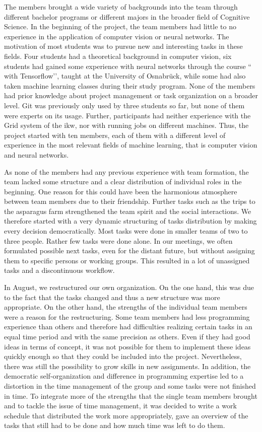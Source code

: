 \bigskip
The members brought a wide variety of backgrounds into the team through different bachelor programs or different majors in the broader field of Cognitive Science. In the beginning of the project, the team members had little to no experience in the application of computer vision or neural networks. The motivation of most students was to pursue new and interesting tasks in these fields. Four students had a theoretical background in computer vision, six students had gained some experience with neural networks through the course `` with Tensorflow’’, taught at the University of Osnabr{\"u}ck, while some had also taken machine learning classes during their study program. None of the members had prior knowledge about project management or task organization on a broader level. Git was previously only used by three students so far, but none of them were experts on its usage. Further, participants had neither experience with the Grid system of the \acrshort{ikw}, nor with running jobs on different machines. Thus, the project started with ten members, each of them with a different level of experience in the most relevant fields of machine learning, that is computer vision and neural networks.

\bigskip
As none of the members had any previous experience with team formation, the team lacked some structure and a clear distribution of individual roles in the beginning. One reason for this could have been the harmonious atmosphere between team members due to their friendship. Further tasks such as the trips to the asparagus farm strengthened the team spirit and the social interactions. We therefore started with a very dynamic structuring of tasks distribution by making every decision democratically. Most tasks were done in smaller teams of two to three people. Rather few tasks were done alone. In our meetings, we often formulated possible next tasks, even for the distant future, but  without assigning them to specific persons or working groups. This resulted in a lot of unassigned tasks and a discontinuous workflow. 

In August, we restructured our own organization. On the one hand, this was due to the fact that the tasks changed and thus a new structure was more appropriate. On the other hand, the strengths of the individual team members were a reason for the restructuring. Some team members had less programming experience than others and therefore had difficulties realizing certain tasks in an equal time period and with the same precision as others. Even if they had good ideas in terms of concept, it was not possible for them to implement these ideas quickly enough so that they could be included into the project. Nevertheless, there was still the possibility to grow skills in new assignments. In addition, the democratic self-organization and difference in programming expertise led to a distortion in the time management of the group and some tasks were not finished in time. To integrate more of the strengths that the single team members brought and to tackle the issue of time management, it was decided to write a work schedule that distributed the work more appropriately, gave an overview of the tasks that still had to be done and how much time was left to do them.

